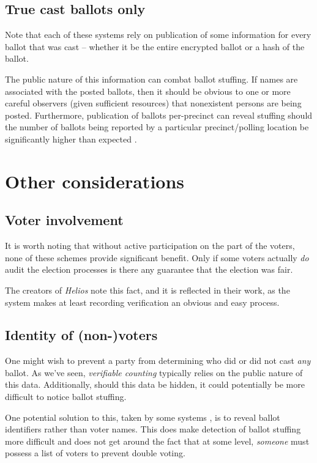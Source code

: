 \documentclass[10pt,twocolumn]{article}
\newcommand{\term}[1]{\textit{#1}}
\begin{document}
\subsection{True cast ballots only}

Note that each of these systems rely on publication of some information for every ballot that was
cast -- whether it be the entire encrypted ballot or a hash of the ballot.

The public nature of this information can combat ballot stuffing. If names are associated with
the posted ballots, then it should be obvious to one or more careful observers (given sufficient
resources) that nonexistent persons are being posted. Furthermore, publication of ballots
per-precinct can reveal stuffing should the number of ballots being reported by a particular
precinct/polling location be significantly higher than expected \cite{helios}.

\section{Other considerations}

\subsection{Voter involvement}

It is worth noting that without active participation on the part of the voters, none of these
schemes provide significant benefit. Only if some voters actually \emph{do} audit the election
processes is there any guarantee that the election was fair.

The creators of \term{Helios} note this fact, and it is reflected in their work, as the system makes at
least recording verification an obvious and easy process.

\subsection{Identity of (non-)voters}

One might wish to prevent a party from determining who did or did not cast \emph{any} ballot.
As we've seen, \term{verifiable counting} typically relies on the public nature of this data.
Additionally, should this data be hidden, it could potentially be more difficult to notice ballot
stuffing.

One potential solution to this, taken by some systems \cite{preta}, is to reveal ballot identifiers
rather than voter names. This does make detection of ballot stuffing more difficult and does not get
around the fact that at some level, \emph{someone} must possess a list of voters to prevent double
voting.
\end{document}

